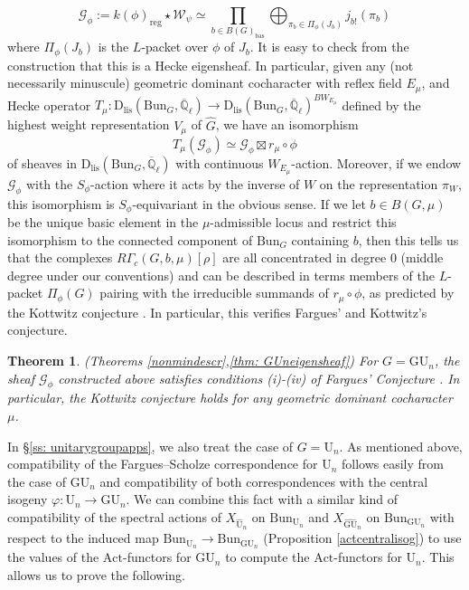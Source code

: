 \documentclass[reqno,11pt]{amsart}
\newtheorem{theorem}{Theorem}[section]
\theoremstyle{remark}
\newcommand{\GU}{\mathrm{GU}}
\newcommand{\U}{\mathrm{U}}
\newcommand{\bas}{\mathrm{bas}}
\newcommand{\Act}{\mathrm{Act}}
\newcommand{\Bun}{\mathrm{Bun}}
\newcommand{\Dlis}{\mathrm{D}_{\mathrm{lis}}}
\def\ol{\overline}
\def\ra{\rightarrow}
\begin{document}
\[ \mathcal{G}_{\phi} := k(\phi)_{\mathrm{reg}} \star \mathcal{W}_{\psi} \simeq \prod_{b \in B(G)_{\bas}} \bigoplus_{\pi_{b} \in \Pi_{\phi}(J_{b})} j_{b!}(\pi_{b}) \]
where $\Pi_{\phi}(J_{b})$ is the $L$-packet over $\phi$ of $J_{b}$. It is easy to check from the construction that this is a Hecke eigensheaf. In particular, given any (not necessarily minuscule) geometric dominant cocharacter with reflex field $E_{\mu}$, and Hecke operator $T_{\mu}: \Dlis(\Bun_{G},\ol{\mathbb{Q}}_{\ell}) \ra \Dlis(\Bun_{G},\ol{\mathbb{Q}}_{\ell})^{BW_{E_{\mu}}}$ defined by the highest weight representation $V_{\mu}$ of $\hat{G}$, we have an isomorphism 
\[ T_{\mu}(\mathcal{G}_{\phi}) \simeq \mathcal{G}_{\phi} \boxtimes r_{\mu} \circ \phi \]
of sheaves in $\Dlis(\Bun_{G},\ol{\mathbb{Q}}_{\ell})$ with continuous $W_{E_{\mu}}$-action. Moreover, if we endow $\mathcal{G}_{\phi}$ with the $S_{\phi}$-action where it acts by the inverse of $W$ on the representation $\pi_{W}$, this isomorphism is $S_{\phi}$-equivariant in the obvious sense. If we let $b \in B(G,\mu)$ be the unique basic element in the $\mu$-admissible locus and restrict this isomorphism to the connected component of $\Bun_{G}$ containing $b$, then this tells us that the complexes $R\Gamma_{c}(G,b,\mu)[\rho]$ are all concentrated in degree $0$ (middle degree under our conventions) and can be described in terms members of the $L$-packet $\Pi_{\phi}(G)$ pairing with the irreducible summands of $r_{\mu} \circ \phi$, as predicted by the Kottwitz conjecture \cite[Conjecture~1.0.1]{HKW}. In particular, this verifies Fargues' and Kottwitz's conjecture. 
\begin{theorem}{(Theorems \ref{nonmindescr},\ref{thm: GUneigensheaf})}{\label{thm: intro GUeigensheaf}}
For $G = \GU_{n}$, the sheaf $\mathcal{G}_{\phi}$ constructed above satisfies conditions (i)-(iv) of Fargues' Conjecture \cite[Conjecture~4.1]{Fa}. In particular, the Kottwitz conjecture \cite[Conjecture~I.0.1]{HKW} holds for any geometric dominant cocharacter $\mu$. 
\end{theorem}
In \S \ref{ss: unitarygroupapps}, we also treat the case of $G = \U_{n}$. As mentioned above, compatibility of the Fargues--Scholze correspondence for $\U_{n}$ follows easily from the case of $\GU_{n}$ and compatibility of both correspondences with the  central isogeny $\varphi: \U_{n} \ra \GU_{n}$. We can combine this fact with a similar kind of compatibility of the spectral actions of $X_{\hat{\U}_{n}}$ on $\Bun_{\U_{n}}$ and $X_{\hat{\GU}_{n}}$ on $\Bun_{\GU_{n}}$ with respect to the induced map $\Bun_{\U_{n}} \ra \Bun_{\GU_{n}}$ (Proposition \ref{actcentralisog}) to use the values of the $\Act$-functors for $\GU_{n}$ to compute the $\Act$-functors for $\U_{n}$. This allows us to prove the following.
\end{document}
